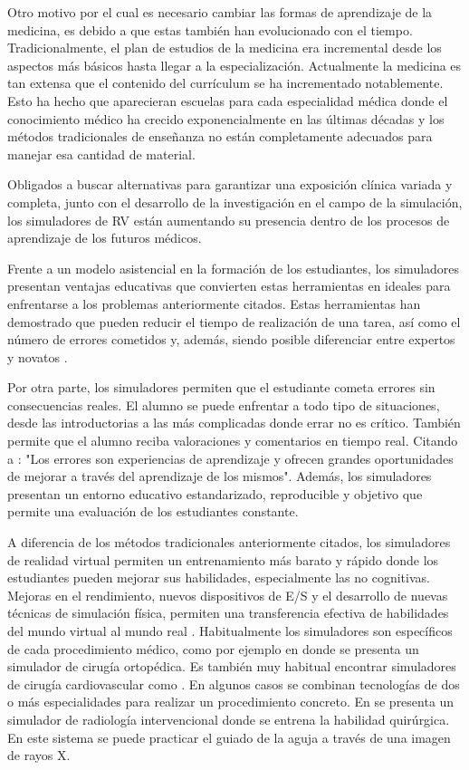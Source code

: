 Otro motivo por el cual es necesario cambiar las formas de aprendizaje de la medicina, es debido a que estas también han evolucionado con el tiempo.
Tradicionalmente, el plan de estudios de la medicina era incremental desde los aspectos más básicos hasta llegar a la especialización. Actualmente la medicina es tan extensa que el contenido del currículum se ha incrementado notablemente. Esto ha hecho que aparecieran escuelas para cada especialidad médica donde el conocimiento médico ha crecido exponencialmente en las últimas décadas y los métodos tradicionales de enseñanza no están completamente adecuados para manejar esa cantidad de material.

Obligados a buscar alternativas para garantizar una exposición clínica variada y completa, junto con el desarrollo de la investigación en el campo de la simulación, los simuladores de \ac{RV} están aumentando su presencia dentro de los procesos de aprendizaje de los futuros médicos.

Frente a un modelo asistencial en la formación de los estudiantes, los simuladores presentan  ventajas educativas que convierten estas herramientas en ideales para enfrentarse a los problemas anteriormente citados. Estas herramientas han demostrado que pueden reducir el tiempo de realización de una tarea, así como el número de errores cometidos y, además, siendo posible diferenciar entre expertos y novatos \cite{Gurusamy08}.

Por otra parte, los simuladores permiten que el estudiante cometa errores sin consecuencias reales. %
El alumno se puede enfrentar a todo tipo de situaciones, desde las introductorias a las más complicadas donde errar no es crítico. También permite que el alumno reciba valoraciones y comentarios en tiempo real. Citando a \cite{ziv2008educacion}: "Los errores son experiencias de aprendizaje y ofrecen grandes oportunidades de mejorar a través del aprendizaje de los mismos". Además, los simuladores presentan un entorno educativo estandarizado, reproducible y objetivo que permite una evaluación de los estudiantes constante.

A diferencia de los métodos tradicionales anteriormente citados, los simuladores de realidad virtual permiten un entrenamiento más barato y rápido donde los estudiantes pueden mejorar sus habilidades, especialmente las no cognitivas. Mejoras en el rendimiento, nuevos dispositivos de \ac{E/S} y el desarrollo de nuevas técnicas de simulación física, permiten una transferencia efectiva de habilidades del mundo virtual al mundo real \cite{dawereview}.
Habitualmente los simuladores son específicos de cada procedimiento médico, como por ejemplo en \cite{cecil2017advanced} donde se presenta un simulador de cirugía ortopédica. Es también muy habitual encontrar simuladores de cirugía cardiovascular como \cite{korzeniowski2018vcsim3}. En algunos casos se combinan tecnologías de dos o más especialidades para realizar un procedimiento concreto. En  \cite{villard2014interventional} se presenta un simulador de radiología intervencional donde se entrena la habilidad quirúrgica. En este sistema se puede practicar el guiado de la aguja a través de una imagen de rayos X.

